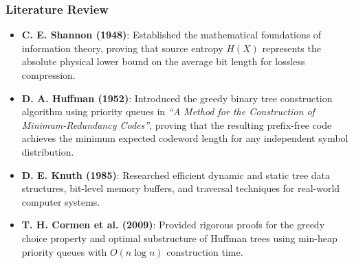 \documentclass[12pt,a4paper]{article}
\begin{document}
\subsubsection{Literature Review}
\begin{itemize}
    \item \textbf{C. E. Shannon (1948)}: Established the mathematical foundations of information theory, proving that source entropy $H(X)$ represents the absolute physical lower bound on the average bit length for lossless compression.
    \item \textbf{D. A. Huffman (1952)}: Introduced the greedy binary tree construction algorithm using priority queues in \textit{``A Method for the Construction of Minimum-Redundancy Codes''}, proving that the resulting prefix-free code achieves the minimum expected codeword length for any independent symbol distribution.
    \item \textbf{D. E. Knuth (1985)}: Researched efficient dynamic and static tree data structures, bit-level memory buffers, and traversal techniques for real-world computer systems.
    \item \textbf{T. H. Cormen et al. (2009)}: Provided rigorous proofs for the greedy choice property and optimal substructure of Huffman trees using min-heap priority queues with $O(n \log n)$ construction time.
\end{itemize}
\end{document}
